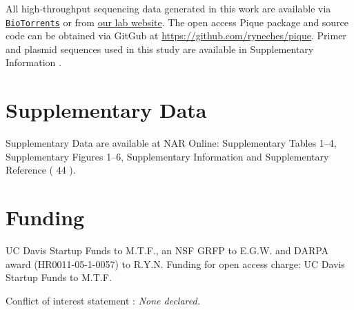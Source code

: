 \begin{refsection}
All high-throughput sequencing data generated in this work are available via \href{http://www.biotorrents.net/details.php?id=259}{\tt BioTorrents} or from \href{http://www.bme.ucdavis.edu/facciotti/resources_data/data/}{our lab website}. The open access Pique package and source code can be obtained via GitGub at \url{https://github.com/ryneches/pique}. Primer and plasmid sequences used in this study are available in Supplementary Information .

\section{Supplementary Data}

Supplementary Data are available at NAR Online: Supplementary Tables 1–4, Supplementary Figures 1–6, Supplementary Information and Supplementary Reference ( 44 ).

\section{Funding}

UC Davis Startup Funds to M.T.F., an NSF GRFP to E.G.W. and DARPA award (HR0011-05-1-0057) to R.Y.N. Funding for open access charge: UC Davis Startup Funds to M.T.F.

Conflict of interest statement : {\em None declared.}

\printbibliography[heading=subbibliography]

\end{refsection}
